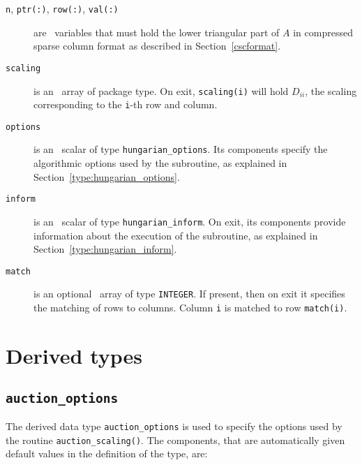 \begin{description}

\item[\texttt{n}, \texttt{ptr(:)}, \texttt{row(:)}, \texttt{val(:)}] are \intentin\ variables that must hold the lower triangular part of $A$ in compressed sparse column format as described in Section~\ref{cscformat}.

\item[\texttt{scaling}] is an \intentout\ array of package type. On exit,
\texttt{scaling(i)} will hold $D_{ii}$, the scaling corresponding to the
\texttt{i}-th row and column.

\item[\texttt{options}] is an \intentin\ scalar of type \texttt{hungarian\_options}. Its components specify the algorithmic options used by the subroutine, as explained in Section~\ref{type:hungarian_options}.

\item[\texttt{inform}] is an \intentout\ scalar of type \texttt{hungarian\_inform}. On exit, its components provide information about the execution of the subroutine, as explained in Section~\ref{type:hungarian_inform}.

\item[\texttt{match}] is an optional \intentout\ array of type {\tt INTEGER}.
If present, then on exit it specifies the matching of rows to columns.
Column \texttt{i} is matched to row \texttt{match(i)}.

\end{description}

\section{Derived types}
\subsection{\texttt{auction\_options}} \label{type:auction_options}

The derived data type \texttt{auction\_options} is used to specify the options used by the routine \texttt{auction\_scaling()}. The components, that are automatically given default values in the definition of the type, are:


